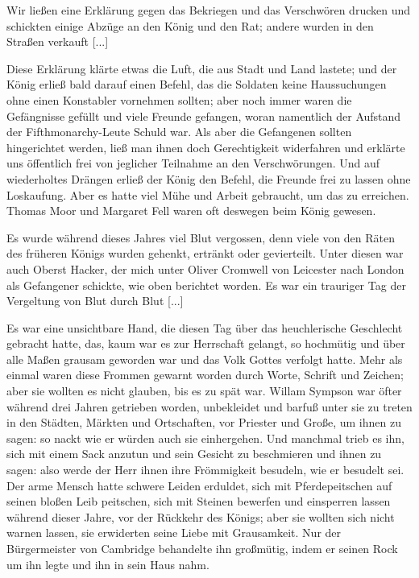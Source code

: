 Wir ließen eine Erklärung gegen das Bekriegen und das
Verschwören drucken und schickten einige Abzüge an den König
und den Rat; andere wurden in den Straßen verkauft [...]

Diese Erklärung klärte etwas die Luft, die aus Stadt und
Land lastete; und der König erließ bald darauf einen Befehl,
das die Soldaten keine Haussuchungen ohne einen Konstabler
vornehmen sollten; aber noch immer waren die Gefängnisse gefüllt
und viele Freunde gefangen, woran namentlich der Aufstand der
Fifthmonarchy-Leute Schuld war. Als aber die Gefangenen
sollten hingerichtet werden, ließ man ihnen doch Gerechtigkeit 
widerfahren und erklärte uns öffentlich frei von jeglicher Teilnahme an
den Verschwörungen. Und auf wiederholtes Drängen erließ der
König den Befehl, die Freunde frei zu lassen ohne Loskaufung.
Aber es hatte viel Mühe und Arbeit gebraucht, um das zu
erreichen. Thomas Moor und Margaret Fell waren oft deswegen
beim König gewesen.

Es wurde während dieses Jahres viel Blut vergossen, denn
viele von den Räten des früheren Königs wurden gehenkt, ertränkt
oder gevierteilt. Unter diesen war auch Oberst Hacker, der mich
unter Oliver Cromwell von Leicester nach London als Gefangener
schickte, wie oben berichtet worden. Es war ein trauriger Tag
der Vergeltung von Blut durch Blut [...]

Es war eine unsichtbare Hand, die diesen Tag über das
heuchlerische Geschlecht gebracht hatte, das, kaum war es zur
Herrschaft gelangt, so hochmütig und über alle Maßen grausam
geworden war und das Volk Gottes verfolgt hatte.
Mehr als einmal waren diese \glqq Frommen\grqq{} gewarnt worden
durch Worte, Schrift und Zeichen; aber sie wollten es nicht
glauben, bis es zu spät war. Willam Sympson war öfter während
drei Jahren getrieben worden, unbekleidet und barfuß unter sie
zu treten in den Städten, Märkten und Ortschaften, vor Priester
und Große, um ihnen zu sagen: \glqq so nackt wie er würden auch sie
einhergehen.\grqq{} Und manchmal trieb es ihn, sich mit einem Sack
anzutun und sein Gesicht zu beschmieren und ihnen zu sagen:
\glqq also werde der Herr ihnen ihre Frömmigkeit besudeln, wie er
besudelt sei.\grqq{} Der arme Mensch hatte schwere Leiden erduldet,
sich mit Pferdepeitschen auf seinen bloßen Leib peitschen, sich mit
Steinen bewerfen und einsperren lassen während dieser Jahre, vor
der Rückkehr des Königs; aber sie wollten sich nicht warnen
lassen, sie erwiderten seine Liebe mit Grausamkeit. Nur der
Bürgermeister von Cambridge behandelte ihn großmütig, indem
er seinen Rock um ihn legte und ihn in sein Haus nahm.


